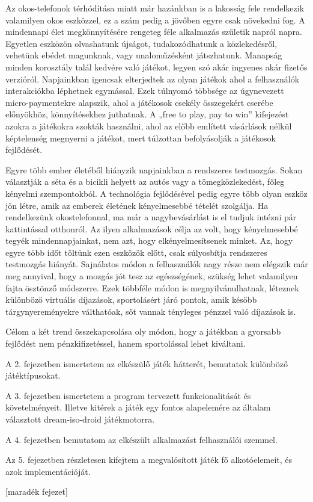 Az okos-telefonok térhódítása miatt már hazánkban is a lakosság fele rendelkezik valamilyen okos eszközzel, ez a szám pedig a jövőben egyre csak növekedni fog. 
A mindennapi élet megkönnyítésére rengeteg féle alkalmazás születik napról napra. 
Egyetlen eszközön olvashatunk újságot, tudakozódhatunk a közlekedésről, vehetünk ebédet magunknak, vagy unaloműzésként játszhatunk. 
Manapság minden korosztály talál kedvére való játékot, legyen szó akár ingyenes akár fizetős verzióról. 
Napjainkban igencsak elterjedtek az olyan játékok ahol a felhasználók interakciókba léphetnek egymással. 
Ezek túlnyomó többsége az úgynevezett micro-paymentekre alapszik, ahol a játékosok csekély összegekért cserébe előnyökhöz, könnyítésekhez juthatnak. 
A „free to play, pay to win” kifejezést azokra a játékokra szokták használni, ahol az előbb említett vásárlások nélkül képtelenség megnyerni a játékot, mert túlzottan befolyásolják a játékosok fejlődését.

Egyre több ember életéből hiányzik napjainkban a rendszeres testmozgás. 
Sokan választják a séta és a bicikli helyett az autós vagy a tömegközlekedést, főleg kényelmi szempontokból. 
A technológia fejlődésével pedig egyre több olyan eszköz jön létre, amik az emberek életének kényelmesebbé tételét szolgálja. 
Ha rendelkezünk okostelefonnal, ma már a nagybevásárlást is el tudjuk intézni pár kattintással otthonról. 
Az ilyen alkalmazások célja az volt, hogy kényelmesebbé tegyék mindennapjainkat, nem azt, hogy elkényelmesítsenek minket. 
Az, hogy egyre több időt töltünk ezen eszközök előtt, csak súlyosbítja rendszeres testmozgás hiányát. 
Sajnálatos módon a felhasználók nagy része nem elégszik már meg annyival, hogy a mozgás jót tesz az egészségének, szükség lehet valamilyen fajta ösztönző módszerre. 
Ezek többféle módon is megnyilvánulhatnak, léteznek különböző virtuális díjazások, sportolásért járó pontok, amik később tárgynyereményekre válthatóak, sőt vannak tényleges pénzzel való díjazások is.

Célom a két trend összekapcsolása oly módon, hogy a játékban a gyorsabb fejlődést nem pénzkifizetéssel, hanem sportolással lehet kiváltani. 

A 2. fejezetben ismertetem az elkészülő játék hátterét, bemutatok különböző játéktípusokat. 

A 3. fejezetben ismertetem a program tervezett funkcionalitását és követelményeit. 
Illetve kitérek a játék egy fontos alapelemére az általam választott dream-iso-droid játékmotorra. 

A 4. fejezetben bemutatom az elkészült alkalmazást felhasználói szemmel. 

Az 5. fejezetben részletesen kifejtem a megvalósított játék fő alkotóelemeit, és azok implementációját. 

[maradék fejezet]